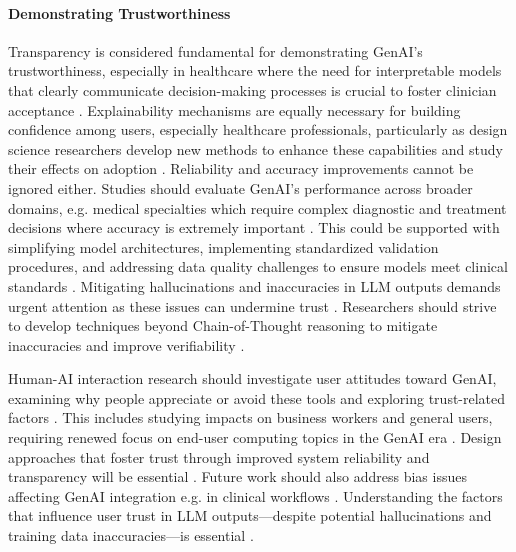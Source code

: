 \paragraph{Demonstrating Trustworthiness}
Transparency is considered fundamental for demonstrating GenAI's trustworthiness, especially in healthcare where the need for interpretable models that clearly communicate decision-making processes is crucial to foster clinician acceptance \parencite{R02,S01,S16}. 
Explainability mechanisms are equally necessary for building confidence among users, especially healthcare professionals, particularly as design science researchers develop new methods to enhance these capabilities and study their effects on adoption \parencite{R02,R04}.
Reliability and accuracy improvements cannot be ignored either. Studies should evaluate GenAI's performance across broader domains, e.g. medical specialties which require complex diagnostic and treatment decisions where accuracy is extremely important \parencite{S02,S16}. This could be supported with simplifying model architectures, implementing standardized validation procedures, and addressing data quality challenges to ensure models meet clinical standards \parencite{S05,S07}.
Mitigating hallucinations and inaccuracies in LLM outputs demands urgent attention as these issues can undermine trust \parencite{R02, S18}. Researchers should strive to develop techniques beyond Chain-of-Thought reasoning to mitigate inaccuracies and improve verifiability \parencite{S18, R08}.

Human-AI interaction research should investigate user attitudes toward GenAI, examining why people appreciate or avoid these tools and exploring trust-related factors \parencite{R02,R09}. This includes studying impacts on business workers and general users, requiring renewed focus on end-user computing topics in the GenAI era \parencite{R10}. Design approaches that foster trust through improved system reliability and transparency will be essential \parencite{R04}. Future work should also address bias issues affecting GenAI integration e.g. in clinical workflows \parencite{R09}.
Understanding the factors that influence user trust in LLM outputs—despite potential hallucinations and training data inaccuracies—is essential \parencite{R02}.


